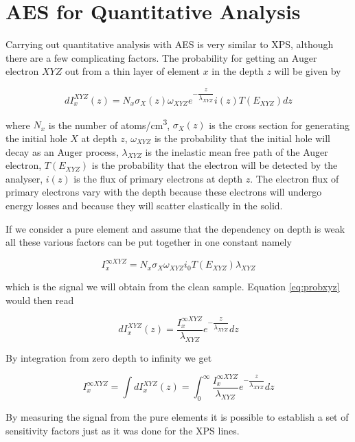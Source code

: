 \section{AES for Quantitative Analysis}
Carrying out quantitative analysis with AES is very similar to XPS, although there are a few complicating factors. The probability for getting an Auger electron $XYZ$ out from a thin layer of element $x$ in the depth $z$ will be given by

\begin{equation}\label{eq:probxyz}
dI^{XYZ}_x(z)=N_x\sigma_X(z)\omega_{XYZ}e^{-\dfrac{z}{\lambda_{XYZ}}}i(z)T(E_{XYZ})dz
\end{equation}
          
\noindent where $N_x$ is the number of \si{atoms/cm^3}, $\sigma_X(z)$ is the cross section for generating the initial hole $X$ at depth $z$, $\omega_{XYZ}$ is the probability that the initial hole will decay as an Auger process, $\lambda_{XYZ}$ is the inelastic mean free path of the Auger electron, $T(E_{XYZ})$ is the probability that the electron will be detected by the analyser, $i(z)$ is the flux of primary electrons at depth $z$. The electron flux of primary electrons vary with the depth because these electrons will undergo energy losses and because they will scatter elastically in the solid. 

If we consider a pure element and assume that the dependency on depth is weak all these various factors can be put together in one constant namely
          
\begin{equation}
I^{\infty XYZ}_x=N_x\sigma_X\omega_{XYZ}i_0T(E_{XYZ})\lambda_{XYZ}
\end{equation}

\noindent which is the signal we will obtain from the clean sample. Equation \eqref{eq:probxyz} would then read

\begin{equation}
dI_x^{XYZ}(z)=\frac{I^{\infty XYZ}_x}{\lambda_{XYZ}}e^{-\dfrac{z}{\lambda_{XYZ}}}dz
\end{equation}

By integration from zero depth to infinity we get

\begin{equation}
I^{\infty XYZ}_x=\int dI_x^{XYZ}(z)=\int_0^{\infty}\frac{I^{\infty XYZ}_x}{\lambda_{XYZ}}e^{-\dfrac{z}{\lambda_{XYZ}}}dz 
\end{equation}

By measuring the signal from the pure elements it is possible to establish a set of sensitivity factors just as it was done for the XPS lines.

